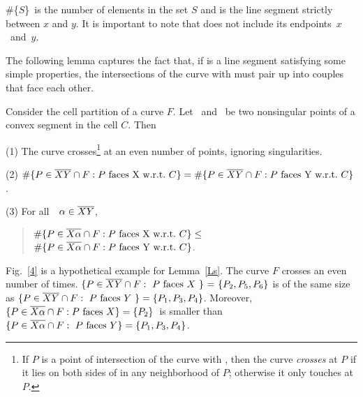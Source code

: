 \begin{notation}
\#\{$S$\}\ is the number of elements in the set $S$ and
 is the line segment strictly between $x$ and $y$.
It is important to note that 
 does not include its \mbox{endpoints $x$ and $y$}.
\end{notation}

The following lemma captures the fact that, if \seg{\x\y} is a line segment 
satisfying some simple properties, the intersections of the curve with 
\seg{\x\y} must pair up into couples that face each other.

\begin{lemma}
\label{Ls}
Consider the cell partition of a curve $F$.
Let \x\ and \y\ be two nonsingular points of a convex segment in the cell $C$.
Then

{\samepage
{\rm (1)} The curve crosses\footnote{If $P$ is a point of intersection of the curve 
	with \seg{\x\y}, then the curve {\em crosses} \seg{\x\y} at $P$ if it lies 
	on both sides of \seg{\x\y} in any neighborhood of $P$; otherwise it 
	only touches \seg{\x\y} at $P$.}
\seg{\x\y} at an even number of points, ignoring singularities.

}
{\rm (2)} $\#\{P \in \seg{\x\y} \cap F: P \mbox{ faces \x\ w.r.t.\ $C$}\} = 
\#\{P \in \seg{\x\y} \cap F: P \mbox{ faces \y\ w.r.t.\ $C$}\}$.

{\rm (3)} For all\ \ $\alpha \in \mbox{$\overline{XY}$}$,\ \ \nopagebreak 
\begin{quote}
$\#\{P \in\mbox{$\overline{X\alpha}$}\cap F: P \mbox{ faces X\ w.r.t.\ $C$}\} \leq$
$\#\{P \in \mbox{$\overline{X\alpha}$}\cap F: P \mbox{ faces Y\ w.r.t.\ $C$}\}$.
\end{quote}
\end{lemma}

\vspace{.2in}

\begin{example}
{\rm 
Fig.~\ref{4} is a hypothetical example for Lemma~\ref{Ls}.
The curve $F$ crosses \seg{\x\y} an even number of times.
$\{ P \in \mbox{$\overline{XY}$} \cap F:\mbox{ $P$ faces $X$\ \} = \{}P_{2},P_{5},P_{6}\}$
is of the same size as 
$\{ P \in \mbox{$\overline{XY}$} \cap F:\mbox{ $P$ faces $Y$ } \} = \{P_{1},P_{3},P_{4}\}$.
Moreover,
$\{ P \in \mbox{$\overline{X\alpha}$} \cap F: \mbox{$P$ faces $X$} \} = \{P_{2}\}$\ 
is smaller than
$\{ P \in \mbox{$\overline{X\alpha}$} \cap F: \mbox{ $P$ faces $Y$} \} = \{P_{1},P_{3},P_{4}\}$.
}
\end{example}
%

